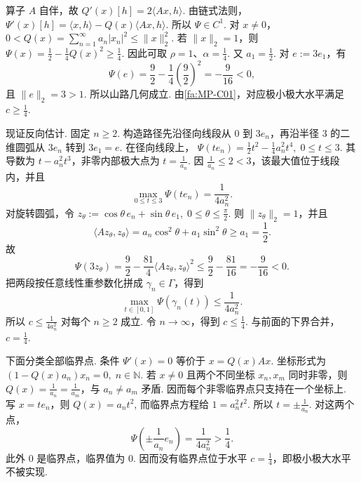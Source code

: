 算子 \(\displaystyle A\) 自伴，故
\(\displaystyle Q'(x)[h] = 2\langle Ax,h\rangle\).
由链式法则，
\(\displaystyle \Psi'(x)[h] = \langle x,h\rangle - Q(x)\langle Ax,h\rangle\).
所以 \(\displaystyle\Psi\in C^1\). 对 \(\displaystyle x\neq0\)，
\(\displaystyle 0<Q(x) = \sum_{n=1}^\infty a_n|x_n|^2 \leqslant \|x\|_2^2\).
若 \(\displaystyle\|x\|_2=1\)，则
\(\displaystyle \Psi(x) = \frac{1}{2}-\frac{1}{4}Q(x)^2 \geqslant \frac{1}{4}\).
因此可取 \(\displaystyle\rho=1\)、\(\displaystyle\alpha=\frac{1}{4}\). 又 \(\displaystyle a_1=\frac{1}{2}\). 对 \(\displaystyle e:=3e_1\)，有
\[
\Psi(e)
=
\frac{9}{2}
-
\frac{1}{4}\left(\frac{9}{2}\right)^2
=
-\frac{9}{16}
<0,
\]
且 \(\displaystyle\|e\|_2=3>1\). 所以山路几何成立. 由\autoref{fa:MP-C01}，对应极小极大水平满足 \(\displaystyle c\geqslant\frac{1}{4}\).

现证反向估计. 固定 \(\displaystyle n\geqslant2\). 构造路径先沿径向线段从 \(\displaystyle0\) 到 \(\displaystyle3e_n\)，再沿半径 \(\displaystyle3\) 的二维圆弧从 \(\displaystyle3e_n\) 转到 \(\displaystyle3e_1=e\). 在径向线段上，
\(\displaystyle \Psi(te_n) = \frac{1}{2}t^2 - \frac{1}{4}a_n^2t^4, \; 0\leqslant t\leqslant3\).
其导数为 \(\displaystyle t-a_n^2t^3\)，非零内部极大点为 \(\displaystyle t=\frac{1}{a_n}\). 因 \(\displaystyle\frac{1}{a_n}\leqslant2<3\)，该最大值位于线段内，并且
\[
\max_{0\leqslant t\leqslant3}\Psi(te_n)
=
\frac{1}{4a_n^2}.
\]
对旋转圆弧，令
\(\displaystyle z_\theta := \cos\theta\,e_n+ \sin\theta\,e_1, \; 0\leqslant\theta\leqslant\frac{\pi}{2}\).
则 \(\displaystyle\|z_\theta\|_2=1\)，并且
\[
\langle Az_\theta,z_\theta\rangle
=
a_n\cos^2\theta+a_1\sin^2\theta
\geqslant
a_1
=
\frac{1}{2}.
\]
故
\[
\Psi(3z_\theta)
=
\frac{9}{2}
-
\frac{81}{4}
\langle Az_\theta,z_\theta\rangle^2
\leqslant
\frac{9}{2}-
\frac{81}{16}
=
-\frac{9}{16}
<0.
\]
把两段按任意线性重参数化拼成 \(\displaystyle\gamma_n\in\Gamma\)，得到
\[
\max_{t\in[0,1]}\Psi(\gamma_n(t))
\leqslant
\frac{1}{4a_n^2}.
\]
所以 \(\displaystyle c\leqslant\frac{1}{4a_n^2}\) 对每个 \(\displaystyle n\geqslant2\) 成立. 令 \(\displaystyle n\to\infty\)，得到 \(\displaystyle c\leqslant\frac{1}{4}\). 与前面的下界合并，
\(\displaystyle c=\frac{1}{4}\).

下面分类全部临界点. 条件 \(\displaystyle\Psi'(x)=0\) 等价于
\(\displaystyle x=Q(x)Ax\).
坐标形式为
\(\displaystyle (1-Q(x)a_n)x_n=0, \; n\in\mathbb N\).
若 \(\displaystyle x\neq0\) 且两个不同坐标 \(\displaystyle x_n,x_m\) 同时非零，则 \(\displaystyle Q(x)=\frac{1}{a_n}=\frac{1}{a_m}\)，与 \(\displaystyle a_n\neq a_m\) 矛盾. 因而每个非零临界点只支持在一个坐标上. 写 \(\displaystyle x=te_n\)，则
\(\displaystyle Q(x)=a_nt^2\),
而临界点方程给
\(\displaystyle 1=a_n^2t^2\).
所以 \(\displaystyle t=\pm\frac{1}{a_n}\). 对这两个点，
\[
\Psi\left(\pm\frac{1}{a_n}e_n\right)
=
\frac{1}{4a_n^2}
>
\frac{1}{4}.
\]
此外 \(\displaystyle0\) 是临界点，临界值为 \(\displaystyle0\). 因而没有临界点位于水平 \(\displaystyle c=\frac{1}{4}\)，即极小极大水平不被实现.

